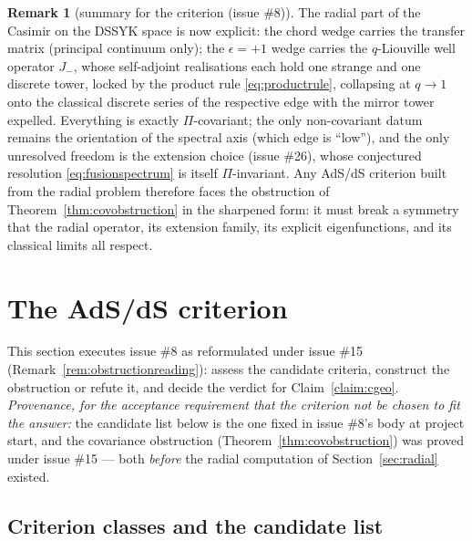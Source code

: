 \documentclass[11pt,a4paper]{article}
\theoremstyle{definition}
\newtheorem{remark}[definition]{Remark}
\theoremstyle{plain}
\begin{document}
\begin{remark}[summary for the criterion (issue \#8)]\label{rem:radialsummary}
The radial part of the Casimir on the DSSYK space is now explicit: the chord wedge carries
the transfer matrix (principal continuum only); the $\epsilon=+1$ wedge carries the
$q$-Liouville well operator $J_{-}$, whose self-adjoint realisations each hold one strange
and one discrete tower, locked by the product rule \eqref{eq:productrule}, collapsing at
$q\to1$ onto the classical discrete series of the respective edge with the mirror tower
expelled. Everything is exactly $\Pi$-covariant; the only non-covariant datum remains the
orientation of the spectral axis (which edge is ``low''), and the only unresolved freedom
is the extension choice (issue \#26), whose conjectured resolution
\eqref{eq:fusionspectrum} is itself $\Pi$-invariant. Any AdS/dS criterion built from the
radial problem therefore faces the obstruction of Theorem~\ref{thm:covobstruction} in the
sharpened form: it must break a symmetry that the radial operator, its extension family,
its explicit eigenfunctions, and its classical limits all respect.
\end{remark}

\section{The AdS/dS criterion}
\label{sec:criterion}


This section executes issue \#8 as reformulated under issue \#15
(Remark~\ref{rem:obstructionreading}): assess the candidate criteria, construct the
obstruction or refute it, and decide the verdict for Claim~\ref{claim:cgeo}.
\emph{Provenance, for the acceptance requirement that the criterion not be chosen to fit the
answer:} the candidate list below is the one fixed in issue \#8's body at project start, and
the covariance obstruction (Theorem~\ref{thm:covobstruction}) was proved under issue \#15 ---
both \emph{before} the radial computation of Section~\ref{sec:radial} existed.

\subsection{Criterion classes and the candidate list}
\end{document}

